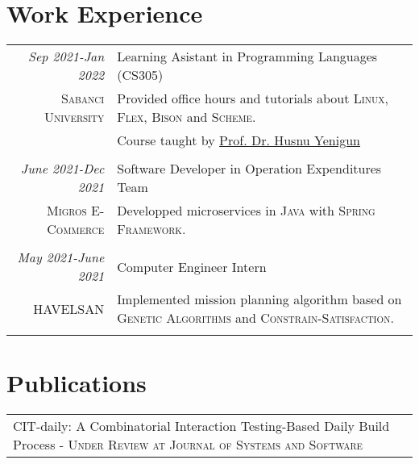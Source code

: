 \documentclass[a4paper,10pt]{article} %
\begin{document}
\section{Work Experience}

\begin{longtable}{r|p{11cm}}

\emph{Sep 2021-Jan 2022} & Learning Asistant in Programming Languages (CS305)\\
\textsc{Sabanci University} & \footnotesize{Provided office hours and tutorials about \textsc{Linux}, \textsc{Flex}, \textsc{Bison} and \textsc{Scheme}.}\\
& \footnotesize{Course taught by \href{mailto:husnuyenigun@sabanciuniv.edu}{Prof. Dr. Husnu Yenigun}}\\
\multicolumn{2}{c}{} \\

\emph{June 2021-Dec 2021} & Software Developer in Operation Expenditures Team\\
\textsc{Migros E-Commerce} & \footnotesize{Developped microservices in \textsc{Java} with \textsc{Spring Framework}.}\\
\multicolumn{2}{c}{} \\

\emph{May 2021-June 2021} & Computer Engineer Intern\\
\textsc{HAVELSAN} & \footnotesize{Implemented mission planning algorithm based on \textsc{Genetic Algorithms} and \textsc{Constrain-Satisfaction}.}\\
\multicolumn{2}{c}{} \\
\end{longtable}



\section{Publications}

\begin{longtable}{p{11cm}}
    CIT-daily: A Combinatorial Interaction Testing-Based Daily Build
Process -  \textsc{Under Review at Journal of Systems and Software}\\
\end{longtable}
\end{document}
